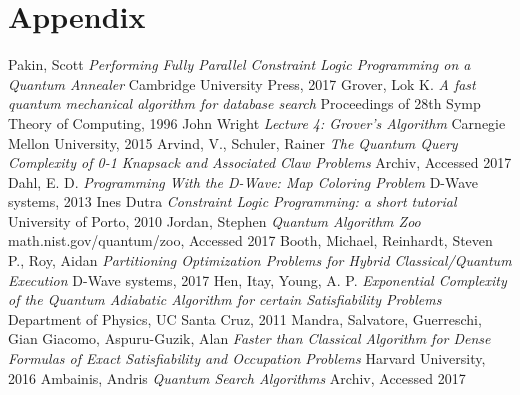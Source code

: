 \documentclass{article}
\begin{document}
\section{Appendix}

\begin{thebibliography}{9}
    \bibitem{}
        Pakin, Scott
        \textit{Performing Fully Parallel Constraint Logic Programming on a Quantum Annealer}
        Cambridge University Press, 2017
    \bibitem{}
        Grover, Lok K.
        \textit{A fast quantum mechanical algorithm for database search}
        Proceedings of 28th Symp Theory of Computing, 1996
    \bibitem{}
        John Wright
        \textit{Lecture 4: Grover's Algorithm}
        Carnegie Mellon University, 2015
    \bibitem{}
        Arvind, V., Schuler, Rainer
        \textit{The Quantum Query Complexity of 0-1 Knapsack and Associated Claw Problems}
        Archiv, Accessed 2017
    \bibitem{}
        Dahl, E. D.
        \textit{Programming With the D-Wave: Map Coloring Problem}
        D-Wave systems, 2013
    \bibitem{}
        Ines Dutra
        \textit{Constraint Logic Programming: a short tutorial}
        University of Porto, 2010
    \bibitem{}
        Jordan, Stephen
        \textit{Quantum Algorithm Zoo}
        math.nist.gov/quantum/zoo, Accessed 2017
    \bibitem{}
        Booth, Michael, Reinhardt, Steven P., Roy, Aidan
        \textit{Partitioning Optimization Problems for Hybrid Classical/Quantum Execution}
        D-Wave systems, 2017
    \bibitem{}
        Hen, Itay, Young, A. P.
        \textit{Exponential Complexity of the Quantum Adiabatic Algorithm for certain Satisfiability Problems}
        Department of Physics, UC Santa Cruz, 2011
    \bibitem{}
        Mandra, Salvatore, Guerreschi, Gian Giacomo, Aspuru-Guzik, Alan
        \textit{Faster than Classical Algorithm for Dense Formulas of Exact Satisfiability and Occupation Problems}
        Harvard University, 2016
    \bibitem{}
        Ambainis, Andris
        \textit{Quantum Search Algorithms}
        Archiv, Accessed 2017

\end{thebibliography}
\end{document}
